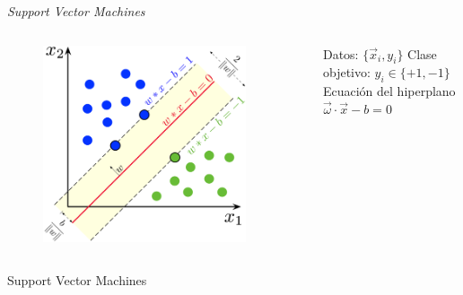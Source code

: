 \documentclass[11pt]{beamer}
\begin{document}
\begin{frame}{\textit{Support Vector Machines}}
\begin{columns}[T]
    \begin{column}{0.55\textwidth}
    \begin{figure}
        \centering
        \includegraphics[width=0.9\textwidth]{images/SVM_margin.png}
        \label{fig:svm_margin}
    \end{figure}
    \end{column}
    
\begin{column}{0.45\textwidth}
    Datos: $\{ \vec{x}_i,y_i\}$
    Clase objetivo: $y_i \in \{+1, -1\}$
    Ecuaci\'on del hiperplano
    $\vec{\omega} \cdot \vec{x} - b = 0$
\end{column}
\end{columns}    
\end{frame}
\begin{frame}{Support Vector Machines}
    
\end{frame}
\end{document}
